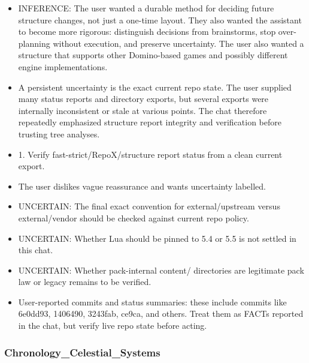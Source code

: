 \documentclass[11pt,a4paper]{report}
\begin{document}
\begin{itemize}
\item INFERENCE: The user wanted a durable method for deciding future structure changes, not just a one-time layout. They also wanted the assistant to become more rigorous: distinguish decisions from brainstorms, stop over-planning without execution, and preserve uncertainty. The user also wanted a structure that supports other Domino-based games and possibly different engine implementations.
\item A persistent uncertainty is the exact current repo state. The user supplied many status reports and directory exports, but several exports were internally inconsistent or stale at various points. The chat therefore repeatedly emphasized structure report integrity and verification before trusting tree analyses.
\item 1. Verify fast-strict/RepoX/structure report status from a clean current export.
\item The user dislikes vague reassurance and wants uncertainty labelled.
\item UNCERTAIN: The final exact convention for external/upstream versus external/vendor should be checked against current repo policy.
\item UNCERTAIN: Whether Lua should be pinned to 5.4 or 5.5 is not settled in this chat.
\item UNCERTAIN: Whether pack-internal content/ directories are legitimate pack law or legacy remains to be verified.
\item User-reported commits and status summaries: these include commits like 6e0dd93, 1406490, 3243fab, ce9ca, and others. Treat them as FACTs reported in the chat, but verify live repo state before acting.
\end{itemize}

\subsubsection{Chronology\_Celestial\_Systems}
\end{document}
